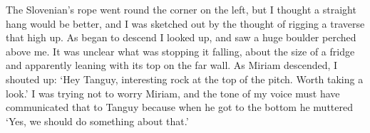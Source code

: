The Slovenian's rope went round the corner on the left, but I thought a straight hang would be better, and I was sketched out by the thought of rigging a traverse that high up. As began to descend I looked up, and saw a huge boulder perched above me. It was unclear what was stopping it falling, about the size of a fridge and apparently leaning with its top on the far wall. As Miriam descended, I shouted up: `Hey Tanguy, interesting rock at the top of the pitch. Worth taking a look.' I was trying not to worry Miriam, and the tone of my voice must have communicated that to Tanguy because when he got to the bottom he muttered `Yes, we should do something about that.'

\begin{marginfigure}
\checkoddpage \ifoddpage \forcerectofloat \else \forceversofloat \fi
\centering
{}

\end{marginfigure}
